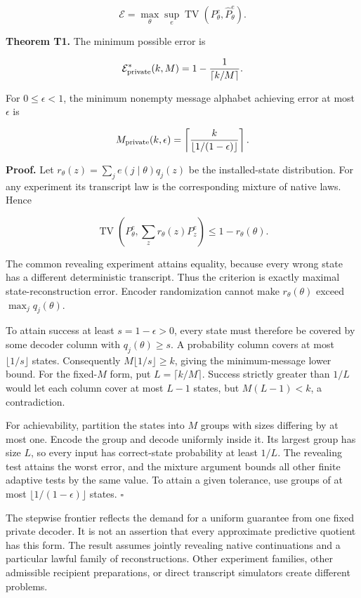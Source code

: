 \documentclass[
  11pt,
  a4paper,
]{article}
\begin{document}
\[
\mathcal E=\max_\theta\sup_e\operatorname{TV}(P_\theta^e,\widehat P_\theta^e).
\]

\textbf{Theorem T1.} The minimum possible error is

\[\mathcal E^*_{\rm private}(k,M)=1-\frac1{\lceil k/M\rceil}.\]

For \(0\le\epsilon<1\), the minimum nonempty message alphabet achieving
error at most \(\epsilon\) is

\[M_{\rm private}(k,\epsilon)=\left\lceil\frac{k}{\lfloor1/(1-\epsilon)\rfloor}\right\rceil.\]

\textbf{Proof.} Let \(r_\theta(z)=\sum_j e(j\mid\theta)q_j(z)\) be the
installed-state distribution. For any experiment its transcript law is
the corresponding mixture of native laws. Hence

\[\operatorname{TV}\left(P_\theta^e,\sum_zr_\theta(z)P_z^e\right)\le1-r_\theta(\theta).\]

The common revealing experiment attains equality, because every wrong
state has a different deterministic transcript. Thus the criterion is
exactly maximal state-reconstruction error. Encoder randomization cannot
make \(r_\theta(\theta)\) exceed \(\max_jq_j(\theta)\).

To attain success at least \(s=1-\epsilon>0\), every state must
therefore be covered by some decoder column with \(q_j(\theta)\ge s\). A
probability column covers at most \(\lfloor1/s\rfloor\) states.
Consequently \(M\lfloor1/s\rfloor\ge k\), giving the minimum-message
lower bound. For the fixed-\(M\) form, put \(L=\lceil k/M\rceil\).
Success strictly greater than \(1/L\) would let each column cover at
most \(L-1\) states, but \(M(L-1)<k\), a contradiction.

For achievability, partition the states into \(M\) groups with sizes
differing by at most one. Encode the group and decode uniformly inside
it. Its largest group has size \(L\), so every input has correct-state
probability at least \(1/L\). The revealing test attains the worst
error, and the mixture argument bounds all other finite adaptive tests
by the same value. To attain a given tolerance, use groups of at most
\(\lfloor1/(1-\epsilon)\rfloor\) states. \(\square\)

The stepwise frontier reflects the demand for a uniform guarantee from
one fixed private decoder. It is not an assertion that every approximate
predictive quotient has this form. The result assumes jointly revealing
native continuations and a particular lawful family of reconstructions.
Other experiment families, other admissible recipient preparations, or
direct transcript simulators create different problems.
\end{document}
